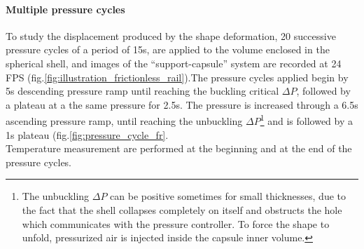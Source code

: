 \paragraph{Multiple pressure cycles}
To study the displacement produced by the shape deformation, 20 successive pressure cycles of a period of 15s, are applied to the volume enclosed in the spherical shell, and images of the "`support-capsule"' system are recorded at 24 FPS (fig.\ref{fig:illustration_frictionless_rail}).The pressure cycles applied begin by 5s descending pressure ramp until reaching the buckling critical $\Delta P$, followed by a plateau at a the same pressure for 2.5s. The pressure is increased through a 6.5s ascending pressure ramp, until reaching the unbuckling $\Delta P$\footnote{The unbuckling $\Delta P$ can be positive sometimes for small thicknesses, due to the fact that the shell collapses completely on itself and obstructs the hole which communicates with the pressure controller. To force the shape to unfold, pressurized air is injected inside the capsule inner volume.} and is followed by a 1s plateau (fig.\ref{fig:pressure_cycle_fr}.\\
Temperature measurement are performed at the beginning and at the end of the pressure cycles.

